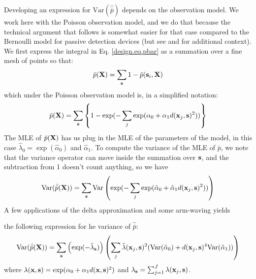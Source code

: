Developing an expression for $\mbox{Var}(\hat{\bar{p}})$ depends on
the observation model. 
We work here with the Poisson observation model, and we do that
because the technical argument that follows is somewhat easier for
that case compared to the Bernoulli model for passive detection
devices (but see
\citet{huggins:1989} and \citet{alho:1990} for additional context). 
We first express the integral in Eq.
\ref{design.eq.pbar} as a summation over a fine mesh of points so
that:
\[
 \bar{p}({\bf X}) = \sum_{{\bf s}} 1 - \bar{p}({\bf s}_{i},{\bf X})
\]
which under the Poisson observation model is, in a simplified notation:
\[
 \bar{p}({\bf X}) = \sum_{{\bf s}} \left\{
1 -  \exp(- \sum_{j}
 \exp(\alpha_{0} + \alpha_{1}  d({\bf x}_{j}, {\bf s})^2))
\right\}
\]
The MLE of $\bar{p}({\bf X})$ has us plug in the MLE of the parameters
of the model, in this case $\hat{\lambda}_{0} = \exp(
\hat{\alpha}_{0})$ and $\hat{\alpha}_{1}$. 
To compute the variance of the MLE of $\bar{p}$, we note that the
variance operator can move inside the summation over ${\bf s}$, and
the subtraction from 1 doesn't count anything, so we have
\[
\mbox{Var}( \hat{\bar{p}}({\bf X}) ) = \sum_{{\bf s}} \mbox{Var}
\left( \exp(- \sum_{j} \exp(\hat{\alpha}_{0} + \hat{\alpha}_{1} d({\bf
    x}_{j}, {\bf s})^2)) \right)
\]
A few applications of the delta approximation and some arm-waving yields %

the following expression for he variance of
$\hat{\bar{p}}$:
\[
\mbox{Var}( \hat{\bar{p}}({\bf X}) )  =
\sum_{{\bf s}} \left( \exp( - \hat{\lambda}_{\bf s} )  \right)
\left(    \sum_{j}  \hat{\lambda}({\bf x}_{j},{\bf s})^{2} (
 \mbox{Var}( \hat{\alpha}_{0}) +
  d({\bf x}_{j}, {\bf    s})^4
\mbox{Var}( \hat{\alpha}_{1})  )
  \right)
\]
where $\lambda({\bf x},{\bf s}) = \exp( \alpha_{0} + \alpha_{1} d({\bf
  x},{\bf s})^{2})$ and $\lambda_{\bf s} = \sum_{j=1}^{J} \lambda({\bf
  x}_{j},{\bf s})$.


